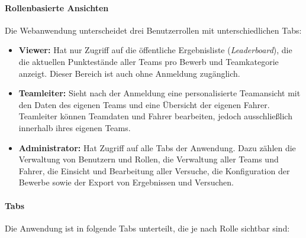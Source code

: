 \paragraph{Rollenbasierte Ansichten}

Die Webanwendung unterscheidet drei Benutzerrollen mit 
unterschiedlichen Tabs:

\begin{itemize}
    \item \textbf{Viewer:} Hat nur Zugriff auf die 
          öffentliche Ergebnisliste (\textit{Leaderboard}), die 
          die aktuellen Punktestände aller Teams pro Bewerb und 
          Teamkategorie anzeigt. Dieser Bereich ist auch ohne 
          Anmeldung zugänglich.

    \item \textbf{Teamleiter:} Sieht nach der Anmeldung eine 
          personalisierte Teamansicht mit den Daten des eigenen 
          Teams und eine Übersicht der eigenen Fahrer. 
          Teamleiter können Teamdaten und Fahrer bearbeiten, 
          jedoch ausschließlich innerhalb ihres eigenen Teams.

    \item \textbf{Administrator:} Hat Zugriff auf alle 
          Tabs der Anwendung. Dazu zählen die Verwaltung von Benutzern und Rollen, die Verwaltung 
          aller Teams und Fahrer, die Einsicht und Bearbeitung 
          aller Versuche, die Konfiguration der Bewerbe 
          sowie der Export von Ergebnissen und Versuchen.
\end{itemize}

\newpage

\paragraph{Tabs}

Die Anwendung ist in folgende Tabs unterteilt, die je nach Rolle 
sichtbar sind:

